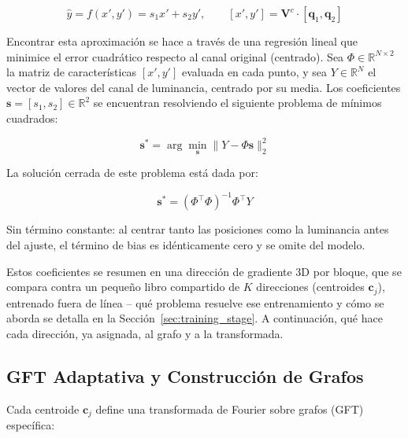         \begin{equation}
            \hat{y} = f(x',y') = s_1 x' + s_2 y', \qquad [x', y'] = \mathbf{V}^c \cdot [\mathbf{q}_1, \mathbf{q}_2]
        \end{equation}

        Encontrar esta aproximación se hace a través de una regresión lineal que minimice el error cuadrático respecto al canal original (centrado). Sea $\Phi \in \mathbb{R}^{N \times 2}$ la matriz de características $[x', y']$ evaluada en cada punto, y sea $Y \in \mathbb{R}^{N}$ el vector de valores del canal de luminancia, centrado por su media. Los coeficientes $\mathbf{s} = [s_1, s_2] \in \mathbb{R}^2$ se encuentran resolviendo el siguiente problema de mínimos cuadrados:

        \begin{equation}
            \mathbf{s}^* = \arg\min_{\mathbf{s}} \| Y - \Phi \mathbf{s} \|_2^2
        \end{equation}

        La solución cerrada de este problema está dada por:

        \begin{equation}
            \mathbf{s}^* = (\Phi^\top \Phi)^{-1} \Phi^\top Y
        \end{equation}

        Sin término constante: al centrar tanto las posiciones como la luminancia antes del
        ajuste, el término de bias es idénticamente cero y se omite del modelo.
        
        

        
    Estos coeficientes se resumen en una dirección de gradiente 3D por bloque, que se compara
    contra un pequeño libro compartido de $K$ direcciones (centroides $\mathbf{c}_j$), entrenado
    fuera de línea -- qué problema resuelve ese entrenamiento y cómo se aborda se detalla en la
    Sección~\ref{sec:training_stage}. A continuación, qué hace cada dirección, ya asignada, al
    grafo y a la transformada.

    \subsection{GFT Adaptativa y Construcción de Grafos}

Cada centroide \(\mathbf{c}_j\) define una transformada de Fourier sobre grafos (GFT) específica:

